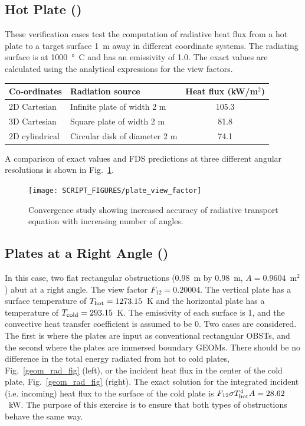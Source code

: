 \documentclass[11pt]{book}
\begin{document}
\subsection{Hot Plate (\texorpdfstring{}{plate\_view\_factor}) }
\label{plate_view_factor}

These verification cases test the computation of radiative heat flux from a hot plate to a target surface 1~m away in different coordinate systems. The radiating surface is at 1000~\si{\degree C} and has an emissivity of 1.0.  The exact values are calculated using the analytical expressions for the view factors.
\begin{center}
\begin{tabular}{|l|l|c|}
\hline Co-ordinates & Radiation source & Heat flux (kW/m$^2$)  \\ \hline \hline
2D Cartesian   & Infinite plate of width 2 m   & 105.3 \\
3D Cartesian   & Square plate of width 2 m     & 81.8 \\
2D cylindrical & Circular disk of diameter 2 m & 74.1 \\ \hline
\end{tabular}
\end{center}
A comparison of exact values and FDS predictions at three different angular resolutions is shown in Fig.~\ref{fig_plate_view_factor}.
\begin{figure}[ht]
\centering
\texttt{[image: SCRIPT\_FIGURES/plate\_view\_factor]}
\caption[The {\ct plate\_view\_factor} test case]{Convergence study showing increased accuracy of radiative transport equation with increasing number of angles.}
\label{fig_plate_view_factor}
\end{figure}

\subsection{Plates at a Right Angle (\texorpdfstring{}{geom\_rad}) }
\label{geom_rad}

In this case, two flat rectangular obstructions (0.98~m by 0.98~m, $A=0.9604$~m$^2$) abut at a right angle. The view factor $F_{12}=0.20004$. The vertical plate has a surface temperature of $T_{\rm hot}=1273.15$~K and the horizontal plate has a temperature of $T_{\rm cold}=293.15$~K. The emissivity of each surface is 1, and the convective heat transfer coefficient is assumed to be 0. Two cases are considered. The first is where the plates are input as conventional rectangular {\ct OBST}s, and the second where the plates are immersed boundary {\ct GEOM}s. There should be no difference in the total energy radiated from hot to cold plates, Fig.~\ref{geom_rad_fig} (left), or the incident heat flux in the center of the cold plate, Fig.~\ref{geom_rad_fig} (right). The exact solution for the integrated incident (i.e. incoming) heat flux to the surface of the cold plate is $F_{12} \sigma T_{\rm hot}^4 A= 28.62$~kW. The purpose of this exercise is to ensure that both types of obstructions behave the same way.
\end{document}
